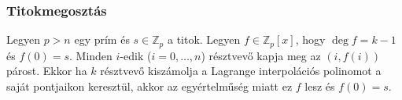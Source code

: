 \subsubsection{Titokmegosztás}
\begin{definition}
	Legyen $p > n$ egy prím és $s \in \mathbb{Z}_p$ a titok.
	Legyen $f \in \mathbb{Z}_p[x]$, hogy $\deg f = k - 1$ és $f(0) = s$.
	Minden $i$-edik ($i = 0, \dots, n$) résztvevő kapja meg
	az $(i, f(i))$ párost.
	Ekkor ha $k$ résztvevő kiszámolja a Lagrange interpolációs polinomot
	a saját pontjaikon keresztül, akkor az egyértelműség miatt ez $f$ lesz
	és $f(0) = s$.
\end{definition}
